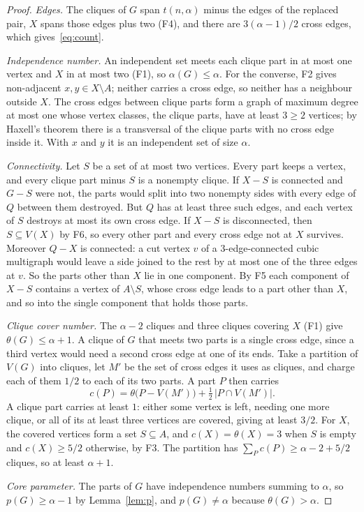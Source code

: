 \begin{proof}
\emph{Edges.} The cliques of $G$ span $t(n,\alpha)$ minus the edges of the replaced pair, $X$ spans those edges plus
two (F4), and there are $3(\alpha-1)/2$ cross edges, which gives~\eqref{eq:count}.

\emph{Independence number.} An independent set meets each clique part in at most one vertex and $X$ in at most two
(F1), so $\alpha(G)\le\alpha$. For the converse, F2 gives non-adjacent $x,y\in X\setminus A$; neither carries a cross
edge, so neither has a neighbour outside $X$. The cross edges between clique parts form a graph of maximum degree at
most one whose vertex classes, the clique parts, have at least $3\ge2$ vertices; by Haxell's theorem \cite{Haxell}
there is a transversal of the clique parts with no cross edge inside it. With $x$ and $y$ it is an independent set of
size $\alpha$.

\emph{Connectivity.} Let $S$ be a set of at most two vertices. Every part keeps a vertex, and every clique part minus
$S$ is a nonempty clique. If $X-S$ is connected and $G-S$ were not, the parts would split into two nonempty sides with
every edge of $Q$ between them destroyed. But $Q$ has at least three such edges, and each vertex of $S$ destroys at most
its own cross edge. If $X-S$ is disconnected, then $S\subseteq V(X)$ by F6, so every other part and every cross edge
not at $X$ survives. Moreover $Q-X$ is connected: a cut vertex $v$ of a $3$-edge-connected cubic multigraph would leave
a side joined to the rest by at most one of the three edges at $v$. So the parts other than $X$ lie in one component.
By F5 each component of $X-S$ contains a vertex of $A\setminus S$, whose cross edge leads to a part other than
$X$, and so into the single component that holds those parts.

\emph{Clique cover number.} The $\alpha-2$ cliques and three cliques covering $X$ (F1) give $\theta(G)\le\alpha+1$. A
clique of $G$ that meets two parts is a single cross edge, since a third vertex would need a second cross edge at one
of its ends. Take a partition of $V(G)$ into cliques, let $M'$ be the set of cross edges it uses as cliques, and charge
each of them $1/2$ to each of its two parts. A part $P$ then carries
\[
c(P)=\theta\bigl(P-V(M')\bigr)+\tfrac12\,|P\cap V(M')|.
\]
A clique part carries at least $1$: either some vertex is left, needing one more clique, or all of its at least three
vertices are covered, giving at least $3/2$. For $X$, the covered vertices form a set $S\subseteq A$, and
$c(X)=\theta(X)=3$ when $S$ is empty and $c(X)\ge5/2$ otherwise, by F3. The partition has $\sum_Pc(P)\ge\alpha-2+5/2$
cliques, so at least $\alpha+1$.

\emph{Core parameter.} The parts of $G$ have independence numbers summing to $\alpha$, so $p(G)\ge\alpha-1$ by
Lemma~\ref{lem:p}, and $p(G)\ne\alpha$ because $\theta(G)>\alpha$.
\end{proof}


